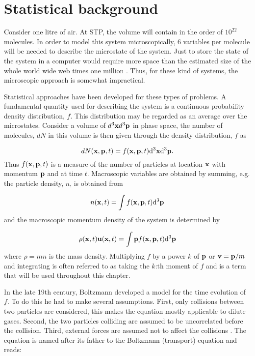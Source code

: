 \section{Statistical background}\label{sec:lbm:stat}
Consider one litre of air. At STP, the volume will contain in the
order of $10^{22}$ molecules. In order to model this system
microscopically, 6 variables per molecule will be needed to describe
the microstate of the system. Just to store the state of the system in
a computer would require more space than the estimated size of the
whole world wide web times one million \cite{wolfram-alpha-web}. Thus,
for these kind of systems, the microscopic approach is somewhat
impractical.


Statistical approaches have been developed for these types of
problems. A fundamental quantity used for describing the system is a
continuous probability density distribution, $f$. This distribution
may be regarded as an average over the microstates. Consider a volume
of $d^3\mathbf{x} d^3\mathbf{p}$ in phase space, the number of molecules, $dN$
in this volume is then given through the density distribution, $f$ as

\begin{equation}
dN(\mathbf{x}, \mathbf{p}, t) = f(\mathbf{x}, \mathbf{p}, t)\mathrm{d}^3\mathbf{x} \mathrm{d}^3\mathbf{p}.
\end{equation}
Thus $f(\mathbf{x}, \mathbf{p}, t)$ is a measure of the number of particles at
location $\mathbf{x}$ with momentum $\mathbf{p}$ and at time $t$. Macroscopic variables are
obtained by summing, e.g. the particle density, $n$, is obtained from

\begin{equation}
n(\mathbf{x}, t) = \int f(\mathbf{x}, \mathbf{p}, t) \mathrm{d}^3\mathbf{p}
\end{equation}
and the macroscopic momentum density of the system is determined by

\begin{equation}
\rho(\mathbf{x}, t) \mathbf{u}(\mathbf{x}, t) = \int \mathbf{p} f(\mathbf{x}, \mathbf{p}, t) \mathrm{d}^3\mathbf{p}
\end{equation}
where $\rho = m n$ is the mass density. Multiplying $f$ by a power $k$ of
$\mathbf{p}$ or $\mathbf{v} = \mathbf{p}/m$ and integrating is often referred to as
taking the $k$:th moment of $f$ and is a term that will be used
throughout this chapter.

In the late 19th century, Boltzmann developed a model for the time
evolution of $f$. To do this he had to make several
assumptions. First, only collisions between two particles are
considered, this makes the equation mostly applicable to dilute
gases. Second, the two particles colliding are assumed to be
uncorrelated before the collision. Third, external forces are assumed
not to affect the collisions \cite{wolf-gladrow}. The equation is
named after its father to the Boltzmann (transport) equation and
reads:

